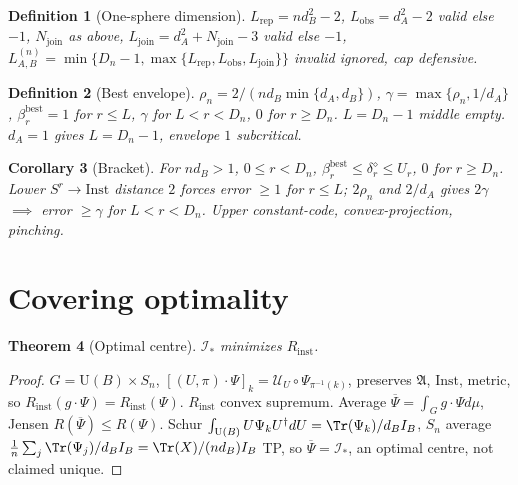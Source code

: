 \documentclass[11pt,a4paper]{article}
\newtheorem{theorem}{Theorem}[section]
\newtheorem{corollary}[theorem]{Corollary}
\newtheorem{definition}[theorem]{Definition}
\newcommand{\Inst}{\mathrm{Inst}}
\begin{document}
\begin{definition}[One-sphere dimension]
$L_{\mathrm{rep}}=nd_B^2-2$, $L_{\mathrm{obs}}=d_A^2-2$ valid else $-1$, $N_{\mathrm{join}}$ as above, $L_{\mathrm{join}}=d_A^2+N_{\mathrm{join}}-3$ valid else $-1$, $L_{A,B}^{(n)}=\min\{D_n-1,\max\{L_{\mathrm{rep}},L_{\mathrm{obs}},L_{\mathrm{join}}\}\}$ invalid ignored, cap defensive.
\end{definition}
\begin{definition}[Best envelope]
$\rho_n=2/(nd_B\min\{d_A,d_B\})$, $\gamma=\max\{\rho_n,1/d_A\}$, $\beta_r^{\mathrm{best}}=1$ for $r\le L$, $\gamma$ for $L<r<D_n$, $0$ for $r\ge D_n$. $L=D_n-1$ middle empty. $d_A=1$ gives $L=D_n-1$, envelope $1$ subcritical.
\end{definition}
\begin{corollary}[Bracket]
For $nd_B>1$, $0\le r<D_n$, $\beta_r^{\mathrm{best}}\le\delta_r^\diamond\le U_r$, $0$ for $r\ge D_n$. Lower $S^r\to\Inst$ distance $2$ forces error $\ge1$ for $r\le L$; $2\rho_n$ and $2/d_A$ gives $2\gamma$ $\implies$ error $\ge\gamma$ for $L<r<D_n$. Upper constant-code, convex-projection, pinching.
\end{corollary}
\section{Covering optimality}
\begin{theorem}[Optimal centre]
$\mathcal I_*$ minimizes $R_{\mathrm{inst}}$.
\end{theorem}
\begin{proof}
$G=\mathrm U(B)\times S_n$, $[(U,\pi)\cdot\Psi]_k=\mathcal U_U\circ\Psi_{\pi^{-1}(k)}$, preserves $\mathfrak A$, $\Inst$, metric, so $R_{\mathrm{inst}}(g\cdot\Psi)=R_{\mathrm{inst}}(\Psi)$. $R_{\mathrm{inst}}$ convex supremum.
Average $\overline\Psi=\int_Gg\cdot\Psi d\mu$, Jensen $R(\overline\Psi)\le R(\Psi)$.
Schur $\int_{\mathrm U(B)}U\Psi_kU^\dagger dU=\Tr(\Psi_k)/d_B I_B$, $S_n$ average $\frac1n\sum_j\Tr(\Psi_j)/d_B I_B=\Tr(X)/(nd_B)I_B$ TP, so $\overline\Psi=\mathcal I_*$, an optimal centre, not claimed unique.
\end{proof}
\end{document}
